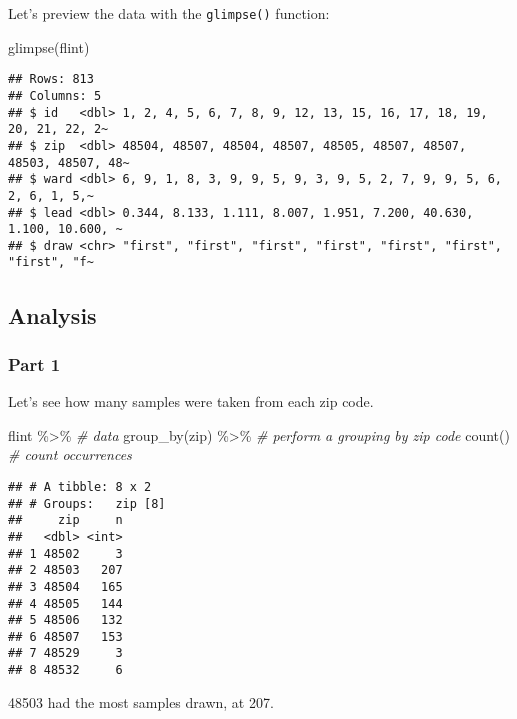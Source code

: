 \documentclass[
]{article}
\newenvironment{Shaded}{\begin{snugshade}}{\end{snugshade}}
\newcommand{\CommentTok}[1]{\textcolor[rgb]{0.56,0.35,0.01}{\textit{#1}}}
\newcommand{\FunctionTok}[1]{\textcolor[rgb]{0.00,0.00,0.00}{#1}}
\newcommand{\NormalTok}[1]{#1}
\newcommand{\SpecialCharTok}[1]{\textcolor[rgb]{0.00,0.00,0.00}{#1}}
\begin{document}
Let's preview the data with the \texttt{glimpse()} function:

\begin{Shaded}
\begin{Highlighting}[]
\FunctionTok{glimpse}\NormalTok{(flint)}
\end{Highlighting}
\end{Shaded}

\begin{verbatim}
## Rows: 813
## Columns: 5
## $ id   <dbl> 1, 2, 4, 5, 6, 7, 8, 9, 12, 13, 15, 16, 17, 18, 19, 20, 21, 22, 2~
## $ zip  <dbl> 48504, 48507, 48504, 48507, 48505, 48507, 48507, 48503, 48507, 48~
## $ ward <dbl> 6, 9, 1, 8, 3, 9, 9, 5, 9, 3, 9, 5, 2, 7, 9, 9, 5, 6, 2, 6, 1, 5,~
## $ lead <dbl> 0.344, 8.133, 1.111, 8.007, 1.951, 7.200, 40.630, 1.100, 10.600, ~
## $ draw <chr> "first", "first", "first", "first", "first", "first", "first", "f~
\end{verbatim}

\hypertarget{analysis}{%
\subsection{Analysis}\label{analysis}}

\hypertarget{part-1}{%
\subsubsection{Part 1}\label{part-1}}

Let's see how many samples were taken from each zip code.

\begin{Shaded}
\begin{Highlighting}[]
\NormalTok{flint }\SpecialCharTok{\%\textgreater{}\%}               \CommentTok{\# data}
  \FunctionTok{group\_by}\NormalTok{(zip) }\SpecialCharTok{\%\textgreater{}\%}     \CommentTok{\# perform a grouping by zip code}
  \FunctionTok{count}\NormalTok{()               }\CommentTok{\# count occurrences}
\end{Highlighting}
\end{Shaded}

\begin{verbatim}
## # A tibble: 8 x 2
## # Groups:   zip [8]
##     zip     n
##   <dbl> <int>
## 1 48502     3
## 2 48503   207
## 3 48504   165
## 4 48505   144
## 5 48506   132
## 6 48507   153
## 7 48529     3
## 8 48532     6
\end{verbatim}

48503 had the most samples drawn, at 207.
\end{document}
